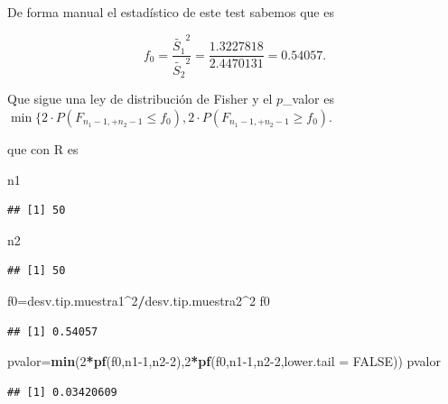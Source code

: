 \documentclass[
]{article}
\newenvironment{Shaded}{\begin{snugshade}}{\end{snugshade}}
\newcommand{\DataTypeTok}[1]{\textcolor[rgb]{0.13,0.29,0.53}{#1}}
\newcommand{\DecValTok}[1]{\textcolor[rgb]{0.00,0.00,0.81}{#1}}
\newcommand{\KeywordTok}[1]{\textcolor[rgb]{0.13,0.29,0.53}{\textbf{#1}}}
\newcommand{\NormalTok}[1]{#1}
\newcommand{\OperatorTok}[1]{\textcolor[rgb]{0.81,0.36,0.00}{\textbf{#1}}}
\newcommand{\OtherTok}[1]{\textcolor[rgb]{0.56,0.35,0.01}{#1}}
\begin{document}
De forma manual el estadístico de este test sabemos que es

\[f_0=\frac{\tilde{S_1}^2}{\tilde{S_2}^2}=\frac{1.3227818}{2.4470131}=0.54057.\]

Que sigue una ley de distribución de Fisher y el \(p\)\_valor es
\(\min\{2\cdot P(F_{n_1-1,+n_2-1}\leq f_0),2\cdot P(F_{n_1-1,+n_2-1}\geq f_0).\)

que con R es

\begin{Shaded}
\begin{Highlighting}[]
\NormalTok{n1}
\end{Highlighting}
\end{Shaded}

\begin{verbatim}
## [1] 50
\end{verbatim}

\begin{Shaded}
\begin{Highlighting}[]
\NormalTok{n2}
\end{Highlighting}
\end{Shaded}

\begin{verbatim}
## [1] 50
\end{verbatim}

\begin{Shaded}
\begin{Highlighting}[]
\NormalTok{f0=desv.tip.muestra1}\OperatorTok{\^{}}\DecValTok{2}\OperatorTok{/}\NormalTok{desv.tip.muestra2}\OperatorTok{\^{}}\DecValTok{2}
\NormalTok{f0}
\end{Highlighting}
\end{Shaded}

\begin{verbatim}
## [1] 0.54057
\end{verbatim}

\begin{Shaded}
\begin{Highlighting}[]
\NormalTok{pvalor=}\KeywordTok{min}\NormalTok{(}\DecValTok{2}\OperatorTok{*}\KeywordTok{pf}\NormalTok{(f0,n1}\DecValTok{{-}1}\NormalTok{,n2}\DecValTok{{-}2}\NormalTok{),}\DecValTok{2}\OperatorTok{*}\KeywordTok{pf}\NormalTok{(f0,n1}\DecValTok{{-}1}\NormalTok{,n2}\DecValTok{{-}2}\NormalTok{,}\DataTypeTok{lower.tail =} \OtherTok{FALSE}\NormalTok{))}
\NormalTok{pvalor}
\end{Highlighting}
\end{Shaded}

\begin{verbatim}
## [1] 0.03420609
\end{verbatim}
\end{document}
